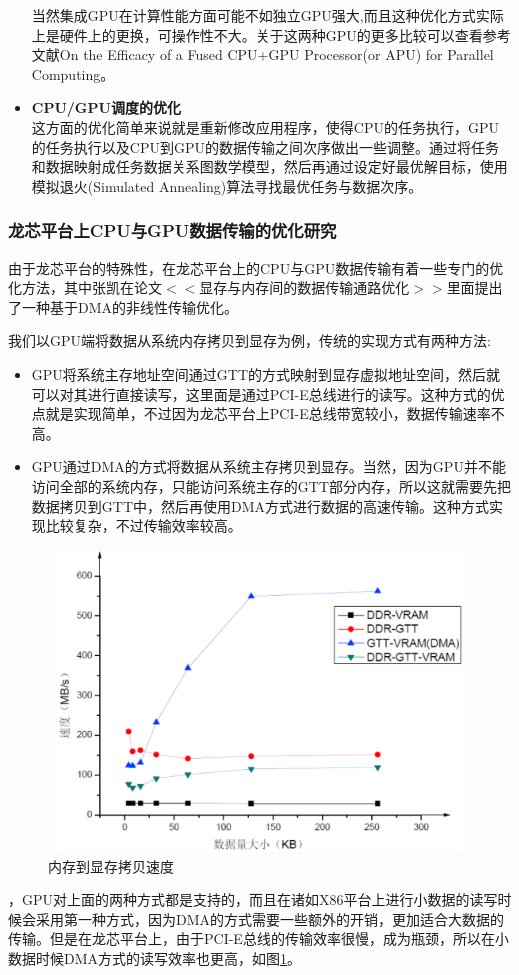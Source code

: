 \begin{itemize}
当然集成GPU在计算性能方面可能不如独立GPU强大,而且这种优化方式实际上是硬件上的更换，可操作性不大。关于这两种GPU的更多比较可以查看参考文献On the Efficacy of a Fused CPU+GPU Processor(or APU) for Parallel Computing\cite{on-the-Efficacy}。


\item{\textbf{CPU/GPU调度的优化}} \\
这方面的优化简单来说就是重新修改应用程序，使得CPU的任务执行，GPU的任务执行以及CPU到GPU的数据传输之间次序做出一些调整。通过将任务和数据映射成任务数据关系图数学模型，然后再通过设定好最优解目标，使用模拟退火(Simulated Annealing)算法寻找最优任务与数据次序。
\end{itemize}

\subsubsection{龙芯平台上CPU与GPU数据传输的优化研究}

由于龙芯平台的特殊性，在龙芯平台上的CPU与GPU数据传输有着一些专门的优化方法，其中张凯在论文$<<$显存与内存间的数据传输通路优化$>>$\cite{gpu-cpu-data}里面提出了一种基于DMA的非线性传输优化。

我们以GPU端将数据从系统内存拷贝到显存为例，传统的实现方式有两种方法:

\begin{itemize}
\item{} GPU将系统主存地址空间通过GTT的方式映射到显存虚拟地址空间，然后就可以对其进行直接读写，这里面是通过PCI-E总线进行的读写。这种方式的优点就是实现简单，不过因为龙芯平台上PCI-E总线带宽较小，数据传输速率不高。
\item{} GPU通过DMA的方式将数据从系统主存拷贝到显存。当然，因为GPU并不能访问全部的系统内存，只能访问系统主存的GTT部分内存，所以这就需要先把数据拷贝到GTT中，然后再使用DMA方式进行数据的高速传输。这种方式实现比较复杂，不过传输效率较高。
\end{itemize}

\begin{figure}[H] 
  \centering
  \includegraphics[width=12cm,height=8cm]{figures/chap02/cpu-gpu-memcpy-zhang}
  \caption{内存到显存拷贝速度}
  \label{fig:cpu-gpu-memcpy-zhang}
\end{figure}

，GPU对上面的两种方式都是支持的，而且在诸如X86平台上进行小数据的读写时候会采用第一种方式，因为DMA的方式需要一些额外的开销，更加适合大数据的传输。但是在龙芯平台上，由于PCI-E总线的传输效率很慢，成为瓶颈，所以在小数据时候DMA方式的读写效率也更高，如图\ref{fig:cpu-gpu-memcpy-zhang}。

